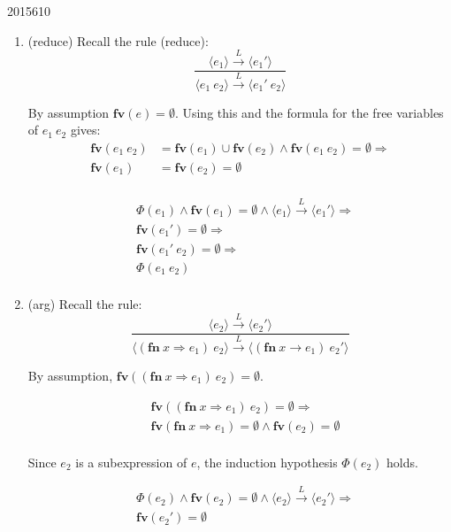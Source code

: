 \documentclass[10pt,\jkfside,a4paper]{article}
\begin{document}
\begin{examquestion}{2015}{6}{10}
\begin{enumerate}[label=(\alph*)]
\begin{enumerate}[label=(\textbf{Case})]
\item (reduce) Recall the rule (reduce):
\[
\dfrac{
\langle e_1 \rangle \stackrel{L}{\to} \langle e_1' \rangle
}{
\langle e_1 \ e_2 \rangle \stackrel{L}{\to} \langle e_1' \ e_2 \rangle
}
\]

By assumption $\mathbf{fv}(e) = \emptyset$. Using this and
the formula for the free variables of $e_1 \ e_2$ gives:
\[
\begin{split}
\mathbf{fv}(e_1 \ e_2) &= \mathbf{fv}(e_1)\cup\mathbf{fv}(e_2)
\wedge \mathbf{fv}(e_1 \ e_2) = \emptyset \Longrightarrow \\
\mathbf{fv}(e_1) &= \mathbf{fv}(e_2) = \emptyset \\
\end{split}
\]

\[
\begin{split}
&\Phi(e_1) \wedge \mathbf{fv}(e_1) = \emptyset \wedge \langle e_1\rangle
\stackrel{L}{\to}\langle e_1' \rangle \Longrightarrow \\
&\mathbf{fv}(e_1') = \emptyset \Longrightarrow \\
&\mathbf{fv}(e_1' \ e_2) = \emptyset \Longrightarrow \\
&\Phi(e_1 \ e_2)\\
\end{split}
\]

\item (arg) Recall the rule:
\[
\dfrac{
\langle e_2 \rangle \stackrel{L}{\to} \langle e_2' \rangle
}{
\langle (\textbf{fn} \ x \Rightarrow e_1) \ e_2 \rangle \stackrel{L}{\to} \langle (\textbf{fn}
\ x \to e_1) \ e_2' \rangle
}
\]

By assumption, $\mathbf{fv}((\textbf{fn} \ x \Rightarrow e_1) \ e_2) =
\emptyset$.

\[
\begin{split}
&\mathbf{fv}((\textbf{fn} \ x \Rightarrow e_1) \ e_2) = \emptyset
\Longrightarrow \\
&\mathbf{fv}(\textbf{fn} \ x \Rightarrow e_1) = \emptyset \wedge \mathbf{fv}
(e_2) = \emptyset \\
\end{split}
\]

Since $e_2$ is a subexpression of $e$, the induction hypothesis $\Phi(e_2)$
holds.

\[
\begin{split}
&\Phi(e_2) \wedge \mathbf{fv}(e_2) = \emptyset \wedge \langle e_2 \rangle
\stackrel{L}{\to} \langle e_2' \rangle \Longrightarrow \\
&\mathbf{fv}(e_2') = \emptyset \\
\end{split}
\]


\end{enumerate}
\end{enumerate}
\end{examquestion}
\end{document}
